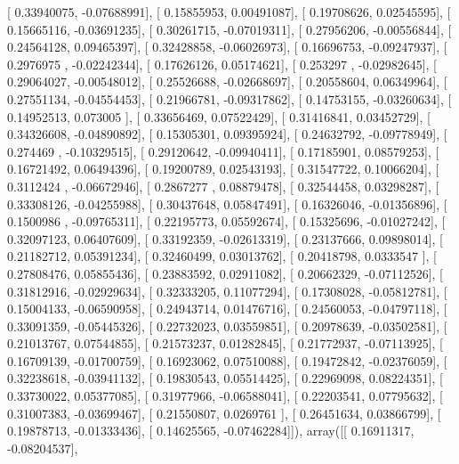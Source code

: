 \documentclass{article}
\begin{document}
       [ 0.33940075, -0.07688991],
       [ 0.15855953,  0.00491087],
       [ 0.19708626,  0.02545595],
       [ 0.15665116, -0.03691235],
       [ 0.30261715, -0.07019311],
       [ 0.27956206, -0.00556844],
       [ 0.24564128,  0.09465397],
       [ 0.32428858, -0.06026973],
       [ 0.16696753, -0.09247937],
       [ 0.2976975 , -0.02242344],
       [ 0.17626126,  0.05174621],
       [ 0.253297  , -0.02982645],
       [ 0.29064027, -0.00548012],
       [ 0.25526688, -0.02668697],
       [ 0.20558604,  0.06349964],
       [ 0.27551134, -0.04554453],
       [ 0.21966781, -0.09317862],
       [ 0.14753155, -0.03260634],
       [ 0.14952513,  0.073005  ],
       [ 0.33656469,  0.07522429],
       [ 0.31416841,  0.03452729],
       [ 0.34326608, -0.04890892],
       [ 0.15305301,  0.09395924],
       [ 0.24632792, -0.09778949],
       [ 0.274469  , -0.10329515],
       [ 0.29120642, -0.09940411],
       [ 0.17185901,  0.08579253],
       [ 0.16721492,  0.06494396],
       [ 0.19200789,  0.02543193],
       [ 0.31547722,  0.10066204],
       [ 0.3112424 , -0.06672946],
       [ 0.2867277 ,  0.08879478],
       [ 0.32544458,  0.03298287],
       [ 0.33308126, -0.04255988],
       [ 0.30437648,  0.05847491],
       [ 0.16326046, -0.01356896],
       [ 0.1500986 , -0.09765311],
       [ 0.22195773,  0.05592674],
       [ 0.15325696, -0.01027242],
       [ 0.32097123,  0.06407609],
       [ 0.33192359, -0.02613319],
       [ 0.23137666,  0.09898014],
       [ 0.21182712,  0.05391234],
       [ 0.32460499,  0.03013762],
       [ 0.20418798,  0.0333547 ],
       [ 0.27808476,  0.05855436],
       [ 0.23883592,  0.02911082],
       [ 0.20662329, -0.07112526],
       [ 0.31812916, -0.02929634],
       [ 0.32333205,  0.11077294],
       [ 0.17308028, -0.05812781],
       [ 0.15004133, -0.06590958],
       [ 0.24943714,  0.01476716],
       [ 0.24560053, -0.04797118],
       [ 0.33091359, -0.05445326],
       [ 0.22732023,  0.03559851],
       [ 0.20978639, -0.03502581],
       [ 0.21013767,  0.07544855],
       [ 0.21573237,  0.01282845],
       [ 0.21772937, -0.07113925],
       [ 0.16709139, -0.01700759],
       [ 0.16923062,  0.07510088],
       [ 0.19472842, -0.02376059],
       [ 0.32238618, -0.03941132],
       [ 0.19830543,  0.05514425],
       [ 0.22969098,  0.08224351],
       [ 0.33730022,  0.05377085],
       [ 0.31977966, -0.06588041],
       [ 0.22203541,  0.07795632],
       [ 0.31007383, -0.03699467],
       [ 0.21550807,  0.0269761 ],
       [ 0.26451634,  0.03866799],
       [ 0.19878713, -0.01333436],
       [ 0.14625565, -0.07462284]]), array([[ 0.16911317, -0.08204537],
\end{document}
